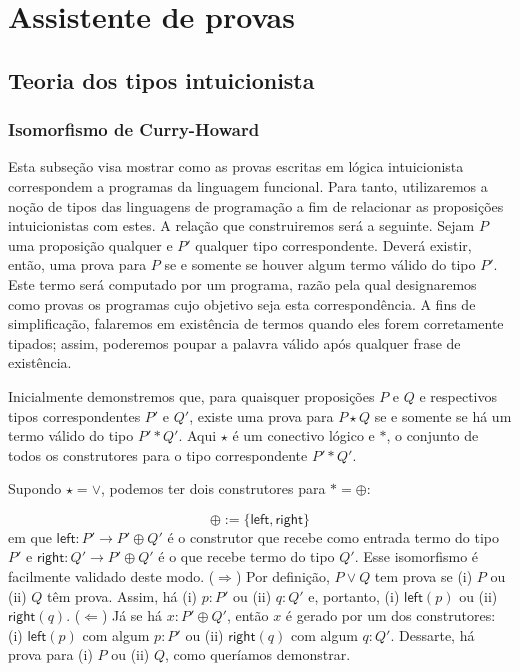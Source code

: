 \chapter{Assistente de provas}

\section{Teoria dos tipos intuicionista}

\subsection{Isomorfismo de Curry-Howard}

Esta subseção visa mostrar como as provas escritas em lógica intuicionista correspondem a programas da linguagem funcional. Para tanto, utilizaremos a noção de tipos das linguagens de programação a fim de relacionar as proposições intuicionistas com estes. A relação que construiremos será a seguinte. Sejam $P$ uma proposição qualquer e $P'$ qualquer tipo correspondente. Deverá existir, então, uma prova para $P$ se e somente se houver algum termo válido do tipo $P'$. Este termo será computado por um programa, razão pela qual designaremos como provas os programas cujo objetivo seja esta correspondência. A fins de simplificação, falaremos em existência de termos quando eles forem corretamente tipados; assim, poderemos poupar a palavra válido após qualquer frase de existência.

Inicialmente demonstremos que, para quaisquer proposições $P$ e $Q$ e respectivos tipos correspondentes $P'$ e $Q'$, existe uma prova para $P \star Q$ se e somente se há um termo válido do tipo $P' \ast Q'$. Aqui $\star$ é um conectivo lógico e $\ast$, o conjunto de todos os construtores para o tipo correspondente $P' \ast Q'$.

Supondo $\star = \vee$, podemos ter dois construtores para $\ast = \oplus$:

$$\oplus := \{ \textsf{left}, \textsf{right} \}$$ em que $\textsf{left} : P' \to P' \oplus Q'$ é o construtor que recebe como entrada termo do tipo $P'$ e $\textsf{right} : Q' \to P' \oplus Q'$ é o que recebe termo do tipo $Q'$. Esse isomorfismo é facilmente validado deste modo. ($\Rightarrow$) Por definição, $P \vee Q$ tem prova se (i) $P$ ou (ii) $Q$ têm prova. Assim, há (i) $p:P'$ ou (ii) $q:Q'$ e, portanto, (i) $\textsf{left} (p)$ ou (ii) $\textsf{right} (q)$. ($\Leftarrow$) Já se há $x:P' \oplus Q'$, então $x$ é gerado por um dos construtores: (i) $\textsf{left} (p)$ com algum $p:P'$ ou (ii) $\textsf{right} (q)$ com algum $q:Q'$. Dessarte, há prova para (i) $P$ ou (ii) $Q$, como queríamos demonstrar.

